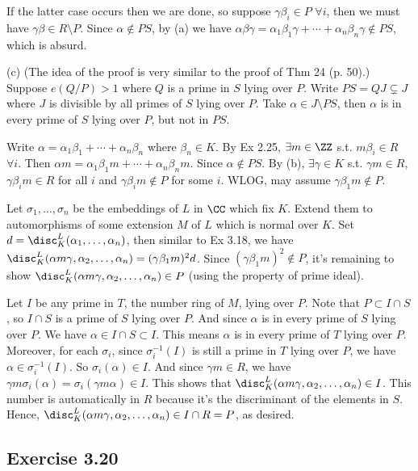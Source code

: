 \documentclass[../Chapter.tex]{subfiles}
\begin{document}
If the latter case occurs then we are done, so suppose $\gamma\beta_i\in P$ $\forall i$, then we must have $\gamma\beta\in R\setminus P$. Since $\alpha\notin PS$, by (a) we have $\alpha\beta\gamma=\alpha_1\beta_1\gamma+\cdots+\alpha_n\beta_n\gamma\notin PS$, which is absurd.

(c) (The idea of the proof is very similar to the proof of Thm 24 (p. 50).) Suppose $e(Q/P)>1$ where $Q$ is a prime in $S$ lying over $P$. Write $PS=QJ\varsubsetneq J$ where $J$ is divisible by all primes of $S$ lying over $P$. Take $\alpha\in J\setminus PS$, then $\alpha$ is in every prime of $S$ lying over $P$, but not in $PS$.

Write $\alpha=\alpha_1\beta_1+\cdots+\alpha_n\beta_n$ where $\beta_n\in K$. By Ex 2.25, $\exists m\in\ZZ$ s.t. $m\beta_i\in R$ $\forall i$. Then $\alpha m=\alpha_1\beta_1m+\cdots+\alpha_n\beta_nm$. Since $\alpha\notin PS$. By (b), $\exists\gamma\in K$ s.t. $\gamma m\in R$, $\gamma\beta_im\in R$ for all $i$ and $\gamma\beta_i m\notin P$ for some $i$. WLOG, may assume $\gamma\beta_1m\notin P$.

Let $\sigma_1,\ldots,\sigma_n$ be the embeddings of $L$ in $\CC$ which fix $K$. Extend them to automorphisms of some extension $M$ of $L$ which is normal over $K$. Set $d=\disc^L_K(\alpha_1,\ldots,\alpha_n)$, then similar to Ex 3.18, we have $\disc^L_K(\alpha m\gamma,\alpha_2,\ldots,\alpha_n)=(\gamma\beta_1 m)^2d$. Since $(\gamma\beta_1m)^2\notin P$, it's remaining to show $\disc^L_K(\alpha m\gamma,\alpha_2,\ldots,\alpha_n)\in P$ (using the property of prime ideal). 

Let $I$ be any prime in $T$, the number ring of $M$, lying over $P$. Note that $P\subset I\cap S$, so $I\cap S$ is a prime of $S$ lying over $P$. And since $\alpha$ is in every prime of $S$ lying over $P$. We have $\alpha\in I\cap S\subset I$. This means $\alpha$ is in every prime of $T$ lying over $P$. Moreover, for each $\sigma_i$, since $\sigma_i^{-1}(I)$ is still a prime in $T$ lying over $P$, we have $\alpha\in \sigma_i^{-1}(I)$. So $\sigma_i(\alpha)\in I$. And since $\gamma m\in R$, we have $\gamma m\sigma_i(\alpha)=\sigma_i(\gamma m\alpha)\in I$. This shows that $\disc^L_K(\alpha m\gamma,\alpha_2,\ldots,\alpha_n)\in I$. This number is automatically in $R$ because it's the discriminant of the elements in $S$. Hence, $\disc^L_K(\alpha m\gamma,\alpha_2,\ldots,\alpha_n)\in I\cap R=P$, as desired.

\subsection*{Exercise 3.20}
\end{document}
